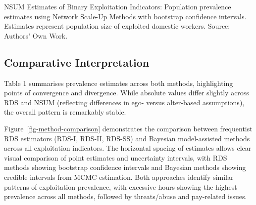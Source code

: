 \documentclass[
  12pt,
  letterpaper,
  DIV=11,
  numbers=noendperiod]{scrartcl}
\theoremstyle{plain}
\theoremstyle{definition}
\begin{document}
\begin{table}

\caption{\label{tbl-nsum-binary-indicators}NSUM Estimates of Binary
Exploitation Indicators: Population prevalence estimates using Network
Scale-Up Methods with bootstrap confidence intervals. Estimates
represent population size of exploited domestic workers. Source:
Authors' Own Work.}


\end{table}%

\subsection{Comparative
Interpretation}\label{comparative-interpretation}

Table 1 summarises prevalence estimates across both methods,
highlighting points of convergence and divergence. While absolute values
differ slightly across RDS and NSUM (reflecting differences in ego-
versus alter-based assumptions), the overall pattern is remarkably
stable.

Figure~\ref{fig-method-comparison} demonstrates the comparison between
frequentist RDS estimators (RDS-I, RDS-II, RDS-SS) and Bayesian
model-assisted methods across all exploitation indicators. The
horizontal spacing of estimates allows clear visual comparison of point
estimates and uncertainty intervals, with RDS methods showing bootstrap
confidence intervals and Bayesian methods showing credible intervals
from MCMC estimation. Both approaches identify similar patterns of
exploitation prevalence, with excessive hours showing the highest
prevalence across all methods, followed by threats/abuse and pay-related
issues.
\end{document}
